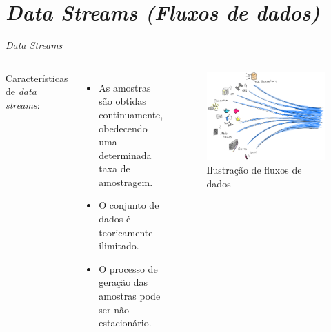 \section{\itshape Data Streams  \textnormal{(Fluxos de  dados)}}

\begin{frame}{\textit{Data Streams}}
    \begin{columns}
	    \centering
	        Características de \textit{data streams}\footnotemark:
        	\begin{itemize}
        	    \item As amostras são obtidas continuamente, obedecendo uma determinada taxa de amostragem.
                \item O conjunto de dados é teoricamente ilimitado. 
                \item O processo de geração das amostras pode ser não estacionário.
        	\end{itemize}
        	
	    \centering
        	\begin{figure}
        	    \centering
        	    \includegraphics[width=\textwidth,height=\textheight,keepaspectratio]{figuras/streams.png}
        	    \caption{Ilustração de fluxos de dados}
        	    \label{fig:ilustracao_fluxo_dados}
        	\end{figure}
	\end{columns}
\end{frame}

